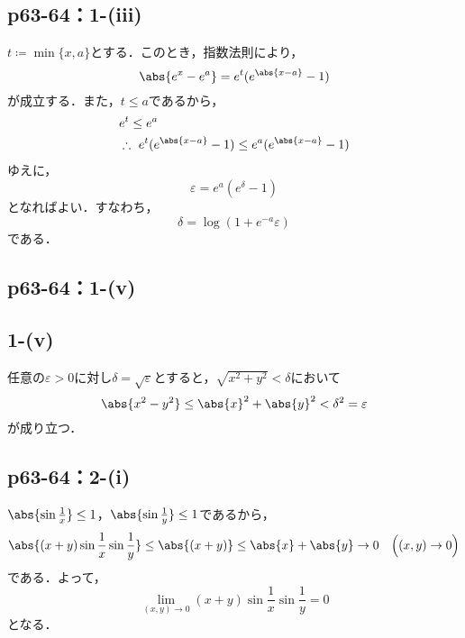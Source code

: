 \documentclass[uplatex,dvipdfmx,a4paper,10pt,fleqn]{jsarticle}
\begin{document}
\subsection*{p63-64：1-(iii)}


\begin{tleftbar}
    $t \coloneqq \min \{x,a\}$とする．このとき，指数法則により，
    \[
        \abs{e^x-e^a}=e^t (e^{\abs{x-a}}-1)
    \]
    が成立する．また，$t \le a$であるから，
    \begin{align*}
       & e^t \le e^a \\
        & \therefore ~ e^t(e^{\abs{x-a}}-1) \le e^a(e^{\abs{x-a}}-1)
    \end{align*}
    ゆえに，
    \[
        \varepsilon = e^a (e^\delta -1)
    \]
    となればよい．すなわち，
    \[
        \delta = \log (1+e^{-a}\varepsilon)
    \]
    である．
\end{tleftbar}


\subsection*{p63-64：1-(v)}



\subsection*{1-(v)}
  \begin{leftbar}
    任意の$\varepsilon > 0$に対し$\delta = \sqrt{\varepsilon}$とすると，$\sqrt{x^2 + y^2} < \delta$において
    \[
      \abs{x^2-y^2} \leq \abs{x}^2 + \abs{y}^2 < \delta^2 = \varepsilon
    \]
    が成り立つ．
  \end{leftbar}

\subsection*{p63-64：2-(i)}

\begin{tleftbar}
    $\abs{\sin \frac{1}{x}} \le 1$，$\abs{\sin \frac{1}{y}} \le 1$であるから，
    \[
        \abs{(x+y) \sin \frac{1}{x} \sin \frac{1}{y}} \le \abs{(x+y)} \le \abs{x}+\abs{y} \to 0 \quad  \Bigl( (x,y) \to 0 \Bigl)
    \]
    である．よって，
    \[
        \lim_{(x,y)\to 0} (x+y) \sin \frac{1}{x} \sin \frac{1}{y} =0
    \]
    となる．
\end{tleftbar}
\end{document}
